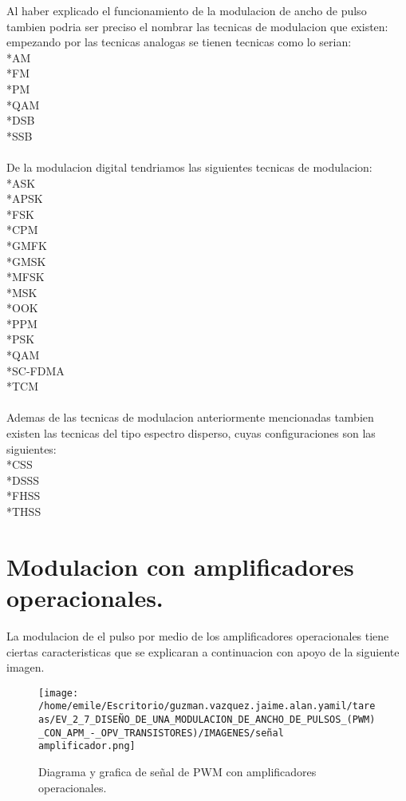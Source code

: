 \documentclass[12pt]{article}
\begin{document}
 Al haber explicado el funcionamiento de la modulacion de ancho de pulso tambien podria ser preciso el nombrar las tecnicas de modulacion que existen:\\
 empezando por las tecnicas analogas se tienen tecnicas como lo serian:\\
 *AM\\
 *FM\\
 *PM\\
 *QAM\\
 *DSB\\
 *SSB\\\\
 De la modulacion digital tendriamos las siguientes tecnicas de modulacion:\\
 *ASK\\
 *APSK\\
 *FSK\\
 *CPM\\
 *GMFK\\
 *GMSK\\
 *MFSK\\
 *MSK\\
 *OOK\\
 *PPM\\
 *PSK\\
 *QAM\\
 *SC-FDMA\\
 *TCM\\\\
 Ademas de las tecnicas de modulacion anteriormente mencionadas tambien existen las tecnicas del tipo espectro disperso, cuyas configuraciones son las siguientes:\\
 *CSS\\
 *DSSS\\
 *FHSS\\
 *THSS\\
 
 
\section{Modulacion con amplificadores operacionales.}
La modulacion de el pulso por medio de los amplificadores operacionales tiene ciertas caracteristicas que se explicaran a continuacion con apoyo de la siguiente imagen.
\begin{figure}[htp]
\centering
\texttt{[image: /home/emile/Escritorio/guzman.vazquez.jaime.alan.yamil/tareas/EV\_2\_7\_DISEÑO\_DE\_UNA\_MODULACION\_DE\_ANCHO\_DE\_PULSOS\_(PWM)\_CON\_APM\_-\_OPV\_TRANSISTORES)/IMAGENES/señal amplificador.png]}
\caption{Diagrama y grafica de señal de PWM con amplificadores operacionales.}
\label{qw}
\end{figure} 
\\
\end{document}
